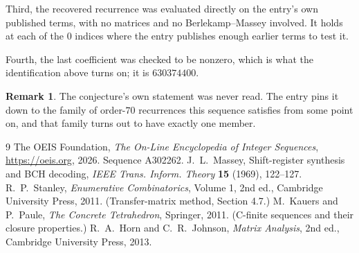 \documentclass[11pt,a4paper]{article}
\theoremstyle{plain}
\theoremstyle{definition}
\newtheorem{remark}[theorem]{Remark}
\begin{document}
Third, the recovered recurrence was evaluated directly on the entry's own published terms, with
no matrices and no Berlekamp--Massey involved. It holds at each of the $0$ indices where
the entry publishes enough earlier terms to test it.

Fourth, the last coefficient was checked to be nonzero, which is what the identification above
turns on; it is $630374400$.

\begin{remark}
The conjecture's own statement was never read. The entry pins it down to the family of
order-$70$ recurrences this sequence satisfies from some point on, and that family turns
out to have exactly one member.
\end{remark}

\begin{thebibliography}{9}
 The OEIS Foundation, \emph{The On-Line Encyclopedia of Integer
Sequences}, \url{https://oeis.org}, 2026. Sequence A302262.
 J.~L.~Massey, Shift-register synthesis and BCH decoding, \emph{IEEE
Trans. Inform. Theory} \textbf{15} (1969), 122--127.
 R.~P.~Stanley, \emph{Enumerative Combinatorics}, Volume 1, 2nd ed.,
Cambridge University Press, 2011. (Transfer-matrix method, Section 4.7.)
 M.~Kauers and P.~Paule, \emph{The Concrete Tetrahedron}, Springer, 2011.
(C-finite sequences and their closure properties.)
 R.~A.~Horn and C.~R.~Johnson, \emph{Matrix Analysis}, 2nd ed., Cambridge
University Press, 2013.
\end{thebibliography}
\end{document}

